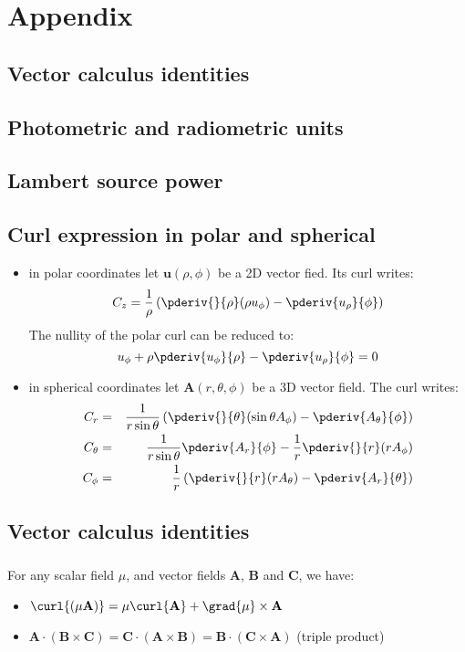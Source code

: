 \chapter*{Appendix}
\label{ch:appendix}

\section*{Vector calculus identities}

\section*{Photometric and radiometric units}

\section*{Lambert source power}

\section*{Curl expression in polar and spherical}
\begin{itemize}
\item in polar coordinates let $\mathbf{u}(\rho, \phi)$ be a 2D vector fied.
Its curl writes:
\[ C_z= \frac{1}{\rho}\left( \pderiv{}{\rho}(\rho u_\phi) - \pderiv{u_\rho}{\phi} \right)\]
The nullity of the polar curl can be reduced to:
\[ u_\phi + \rho\pderiv{u_\phi}{\rho} - \pderiv{u_\rho}{\phi} = 0 \]

\item in spherical coordinates let  $\mathbf{A}(r, \theta, \phi)$ be a 3D vector field.
The curl writes:
\begin{eqnarray*}
C_r &=& \frac{1}{r\sin\theta} \left( \pderiv{}{\theta}(\sin\theta A_\phi) 
        - \pderiv{A_\theta}{\phi} \right) \\
C_\theta &=& \frac{1}{r\sin\theta} \pderiv{A_r}{\phi} - \frac{1}{r}\pderiv{}{r}(rA_\phi) \\
C_\phi &=& \frac{1}{r} \left( \pderiv{}{r}(rA_\theta) - \pderiv{A_r}{\theta} \right)
\end{eqnarray*}
\end{itemize}

\section*{Vector calculus identities}
\paragraph{}
For any scalar field $\mu$, and vector fields $\mathbf{A}$, $\mathbf{B}$ and
$ \mathbf{C}$, we have:
\begin{itemize}
\item $ \curl{(\mu \mathbf{A})} = \mu \curl{\mathbf{A}} + \grad{\mu} \times \mathbf{A}$ 
\item $ \mathbf{A}\cdot(\mathbf{B} \times \mathbf{C}) = \mathbf{C}\cdot(\mathbf{A} 
\times \mathbf{B}) = \mathbf{B}\cdot(\mathbf{C} \times \mathbf{A})$ (triple product)
\end{itemize}

